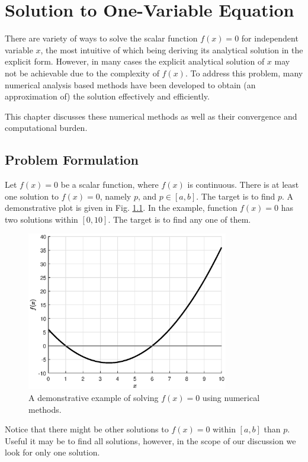 \chapter{Solution to One-Variable Equation}

There are variety of ways to solve the scalar function $f(x)=0$ for independent variable $x$, the most intuitive of which being deriving its analytical solution in the explicit form. However, in many cases the explicit analytical solution of $x$ may not be achievable due to the complexity of $f(x)$. To address this problem, many numerical analysis based methods have been developed to obtain (an approximation of) the solution effectively and efficiently.

This chapter discusses these numerical methods as well as their convergence and computational burden. 

\section{Problem Formulation}

Let $f(x)=0$ be a scalar function, where $f(x)$ is continuous. There is at least one solution to $f(x)=0$, namely $p$, and $p\in \left[a, b\right]$. The target is to find $p$. A demonstrative plot is given in Fig. \ref{fig:part-5:onevarproblemformulation}. In the example, function $f(x)=0$ has two solutions within $\left[0, 10\right]$. The target is to find any one of them.

\begin{figure}[htbp]
\centering
\includegraphics[width=250pt]{chapters/part-5/figures/demo_problem_formulation.eps}
\caption{A demonstrative example of solving $f(x)=0$ using numerical methods.} \label{fig:part-5:onevarproblemformulation}
\end{figure} 

Notice that there might be other solutions to $f(x)=0$ within $\left[a, b\right]$ than $p$. Useful it may be to find all solutions, however, in the scope of our discussion we look for only one solution. 


